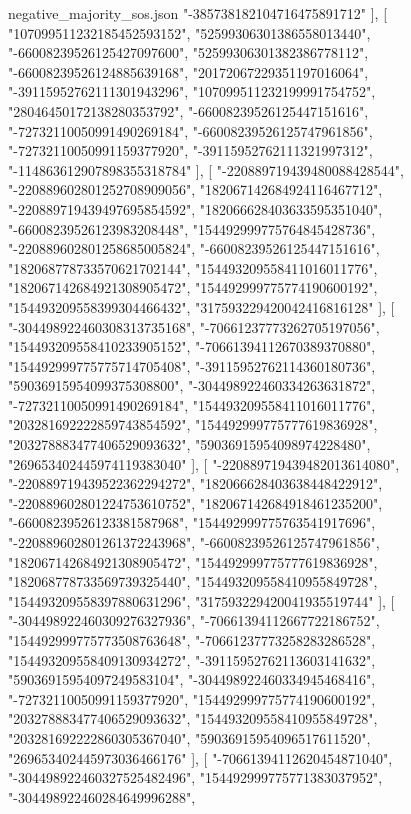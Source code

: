 \begin{filecontents*}[overwrite]{negative_majority_sos.json}
    "-385738182104716475891712"
   ],
   [
    "107099511232185452593152",
    "52599306301386558013440",
    "-66008239526125427097600",
    "52599306301382386778112",
    "-66008239526124885639168",
    "20172067229351197016064",
    "-39115952762111301943296",
    "107099511232199991754752",
    "28046450172138280353792",
    "-66008239526125447151616",
    "-72732110050991490269184",
    "-66008239526125747961856",
    "-72732110050991159377920",
    "-39115952762111321997312",
    "-114863612907898355318784"
   ],
   [
    "-220889719439480088428544",
    "-220889602801252708909056",
    "182067142684924116467712",
    "-220889719439497695854592",
    "182066628403633595351040",
    "-66008239526123983208448",
    "154492999775764845428736",
    "-220889602801258685005824",
    "-66008239526125447151616",
    "182068778733570621702144",
    "154493209558411016011776",
    "182067142684921308905472",
    "154492999775774190600192",
    "154493209558399304466432",
    "317593229420042416816128"
   ],
   [
    "-304498922460308313735168",
    "-70661237773262705197056",
    "154493209558410233905152",
    "-70661394112670389370880",
    "154492999775775714705408",
    "-39115952762114360180736",
    "59036915954099375308800",
    "-304498922460334263631872",
    "-72732110050991490269184",
    "154493209558411016011776",
    "203281692222859743854592",
    "154492999775777619836928",
    "203278883477406529093632",
    "59036915954098974228480",
    "269653402445974119383040"
   ],
   [
    "-220889719439482013614080",
    "-220889719439522362294272",
    "182066628403638448422912",
    "-220889602801224753610752",
    "182067142684918461235200",
    "-66008239526123381587968",
    "154492999775763541917696",
    "-220889602801261372243968",
    "-66008239526125747961856",
    "182067142684921308905472",
    "154492999775777619836928",
    "182068778733569739325440",
    "154493209558410955849728",
    "154493209558397880631296",
    "317593229420041935519744"
   ],
   [
    "-304498922460309276327936",
    "-70661394112667722186752",
    "154492999775773508763648",
    "-70661237773258283286528",
    "154493209558409130934272",
    "-39115952762113603141632",
    "59036915954097249583104",
    "-304498922460334945468416",
    "-72732110050991159377920",
    "154492999775774190600192",
    "203278883477406529093632",
    "154493209558410955849728",
    "203281692222860305367040",
    "59036915954096517611520",
    "269653402445973036466176"
   ],
   [
    "-70661394112620454871040",
    "-304498922460327525482496",
    "154492999775771383037952",
    "-304498922460284649996288",

\end{filecontents*}
